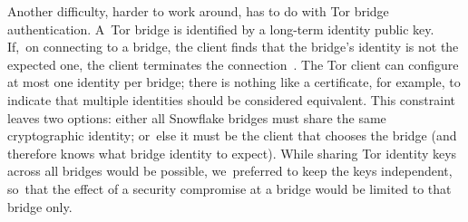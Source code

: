 \documentclass[letterpaper,twocolumn]{article}
\begin{document}
Another difficulty, harder to work around,
has to do with Tor bridge authentication.
A~Tor bridge is identified
by a long-term identity public key.
If,~on connecting to a bridge,
the client finds that the bridge's identity is not the expected one,
the client terminates the connection~\cite{tor-spec-negotiating-channels}.
The Tor client can configure at most one identity per bridge;
there is nothing like a certificate, for example,
to indicate that multiple identities should be considered equivalent.
This constraint leaves two options:
either all Snowflake bridges must share the same cryptographic identity;
or~else it must be the client that chooses the bridge
(and therefore knows what bridge identity to expect).
While sharing Tor identity keys across all bridges would be possible,
we~preferred to keep the keys independent,
so~that the effect of a security compromise
at a bridge would be limited to that bridge only.
\end{document}
